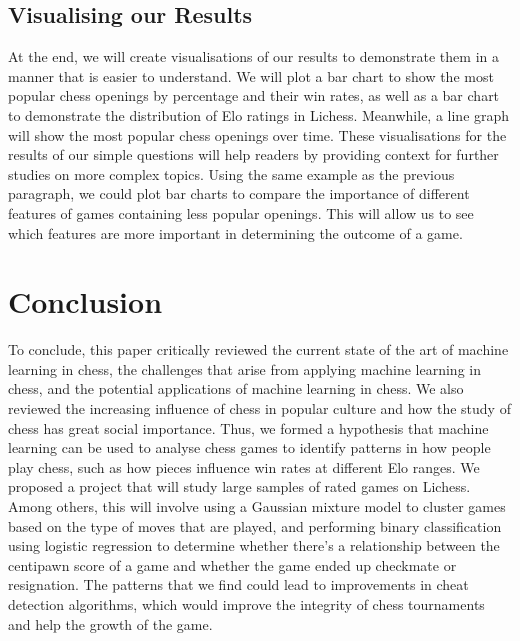 \documentclass[%
 superscriptaddress,
showpacs,preprintnumbers,
 amsmath,
 amssymb,
 aps,
 pra,
showkeys,
onecolumn,
notitlepage,
11pt,
tightenlines      %
]{revtex4-1}
\begin{document}
\subsection{Visualising our Results}
At the end, we will create visualisations of our results to demonstrate them in a manner that is easier to understand. We will plot a bar chart to show the most popular chess openings by percentage and their win rates, as well as a bar chart to demonstrate the distribution of Elo ratings in Lichess. Meanwhile, a line graph will show the most popular chess openings over time. These visualisations for the results of our simple questions will help readers by providing context for further studies on more complex topics. Using the same example as the previous paragraph, we could plot bar charts to compare the importance of different features of games containing less popular openings. This will allow us to see which features are more important in determining the outcome of a game.

\section{Conclusion}
To conclude, this paper critically reviewed the current state of the art of machine learning in chess, the challenges that arise from applying machine learning in chess, and the potential applications of machine learning in chess. We also reviewed the increasing influence of chess in popular culture and how the study of chess has great social importance. Thus, we formed a hypothesis that machine learning can be used to analyse chess games to identify patterns in how people play chess, such as how pieces influence win rates at different Elo ranges. We proposed a project that will study large samples of rated games on Lichess. Among others, this will involve using a Gaussian mixture model to cluster games based on the type of moves that are played, and performing binary classification using logistic regression to determine whether there's a relationship between the centipawn score of a game and whether the game ended up checkmate or resignation. The patterns that we find could lead to improvements in cheat detection algorithms, which would improve the integrity of chess tournaments and help the growth of the game.



\end{document}
